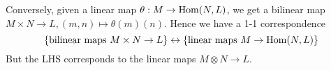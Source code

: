 \documentclass[10pt,a4paper]{article}
\begin{document}
Conversely, given a linear map $\theta: M \to \operatorname{Hom}(N,L)$, we get a bilinear map $M \times N \to L, (m,n)\mapsto \theta(m)(n)$. Hence we have a 1-1 correspondence
\[\{\text{bilinear maps }M\times N \to L\} \leftrightarrow \{\text{linear maps } M \to \operatorname{Hom}(N,L)\}\]
But the LHS corresponds to the linear maps $M \otimes N \to L$.
\end{document}
